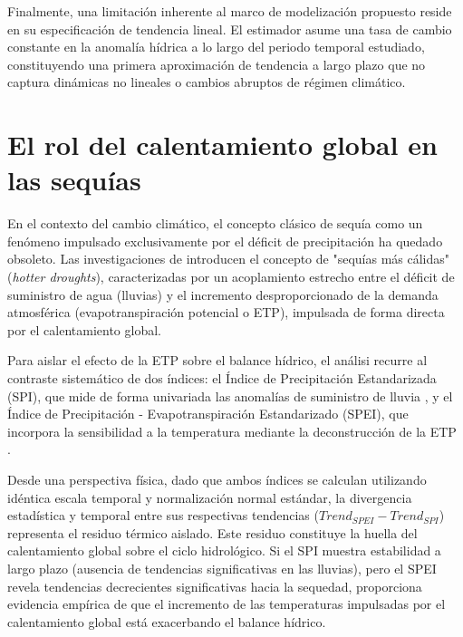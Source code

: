 Finalmente, una limitación inherente al marco de modelización propuesto reside en su especificación de tendencia lineal. El estimador asume una tasa de cambio constante en la anomalía hídrica a lo largo del periodo temporal estudiado, constituyendo una primera aproximación de tendencia a largo plazo que no captura dinámicas no lineales o cambios abruptos de régimen climático.

\section{El rol del calentamiento global en las sequías}

En el contexto del cambio climático, el concepto clásico de sequía como un fenómeno impulsado exclusivamente por el déficit de precipitación ha quedado obsoleto. Las investigaciones de  introducen el concepto de "sequías más cálidas" (\textit{hotter droughts}), caracterizadas por un acoplamiento estrecho entre el déficit de suministro de agua (lluvias) y el incremento desproporcionado de la demanda atmosférica (evapotranspiración potencial o ETP), impulsada de forma directa por el calentamiento global.

Para aislar el efecto de la ETP sobre el balance hídrico, el análisi recurre al contraste sistemático de dos índices: el Índice de Precipitación Estandarizada (SPI), que mide de forma univariada las anomalías de suministro de lluvia \cite{mckee1993}, y el Índice de Precipitación - Evapotranspiración Estandarizado (SPEI), que incorpora la sensibilidad a la temperatura mediante la deconstrucción de la ETP \cite{vicenteserrano2010}. 

Desde una perspectiva física, dado que ambos índices se calculan utilizando idéntica escala temporal y normalización normal estándar, la divergencia estadística y temporal entre sus respectivas tendencias ($Trend_{SPEI} - Trend_{SPI}$) representa el residuo térmico aislado. Este residuo constituye la huella del calentamiento global sobre el ciclo hidrológico. Si el SPI muestra estabilidad a largo plazo (ausencia de tendencias significativas en las lluvias), pero el SPEI revela tendencias decrecientes significativas hacia la sequedad, proporciona evidencia empírica de que el incremento de las temperaturas impulsadas por el calentamiento global está exacerbando el balance hídrico.
